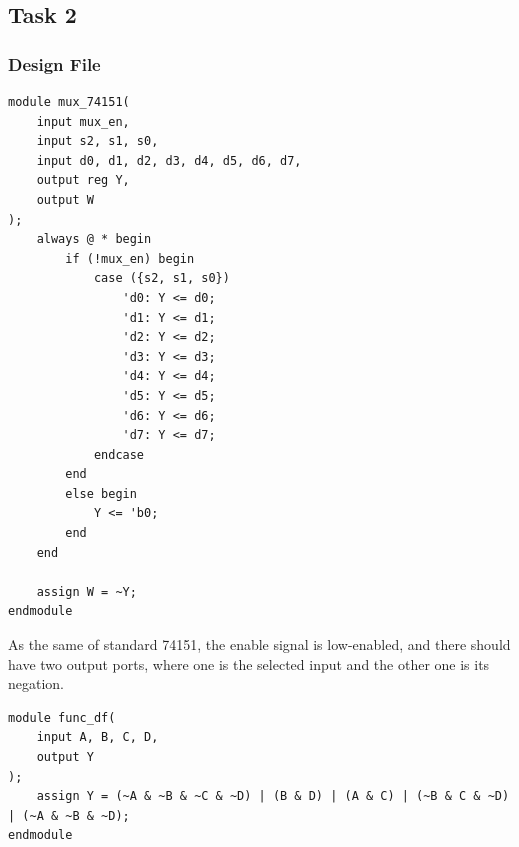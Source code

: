 \documentclass[onecolumn, oneside, ctexart]{SUSTechHomework}
\begin{document}
\subsection*{Task 2}
\subsubsection*{Design File}
\begin{lstlisting}
module mux_74151(
    input mux_en,
    input s2, s1, s0,
    input d0, d1, d2, d3, d4, d5, d6, d7,
    output reg Y,
    output W
);
    always @ * begin
        if (!mux_en) begin
            case ({s2, s1, s0})
                'd0: Y <= d0;
                'd1: Y <= d1;
                'd2: Y <= d2;
                'd3: Y <= d3;
                'd4: Y <= d4;
                'd5: Y <= d5;
                'd6: Y <= d6;
                'd7: Y <= d7;
            endcase
        end
        else begin
            Y <= 'b0;
        end
    end

    assign W = ~Y;
endmodule
\end{lstlisting}
\vspace{-3em}
\par As the same of standard 74151, the enable signal is low-enabled, and there should have two output ports, where one is the selected input and the other one is its negation.\\
\begin{lstlisting}
module func_df(
    input A, B, C, D,
    output Y
);
    assign Y = (~A & ~B & ~C & ~D) | (B & D) | (A & C) | (~B & C & ~D) | (~A & ~B & ~D);
endmodule
\end{lstlisting}
\end{document}
